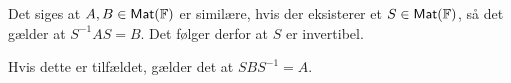 \begin{bemaerk}
Det siges at $A,B \in \textsf{Mat}(\mathbb{F})$ er similære, hvis der eksisterer
et $S \in \textsf{Mat}(\mathbb{F})$, så det gælder at $S^{-1}AS = B$. Det følger derfor
at $S$ er invertibel.

Hvis dette er tilfældet, gælder det at $SBS^{-1} = A$.
\end{bemaerk}
